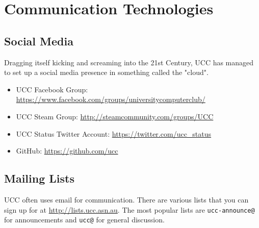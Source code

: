 \chapter{Communication Technologies}\label{Communications}


\newenvironment{ucclist}[1]
{
	\begin{mdframed}[nobreak=true]
	\subsection{#1}
	\begin{mdframed}
		Address:  <\href{mailto:#1@ucc.asn.au}{#1@ucc.asn.au}>
	\end{mdframed}
	\begin{mdframed}
		Subscribe:  \small{\url{http://lists.ucc.asn.au/mailman/listinfo/#1}}
	\end{mdframed}


	
}{\end{mdframed}}
\section{Social Media}

Dragging itself kicking and screaming into the 21st Century, UCC has managed to set up a social media presence in something called the "cloud".

\begin{itemize}
\item UCC Facebook Group:  \\ \noindent \url{https://www.facebook.com/groups/universitycomputerclub/}
\item UCC Steam Group: \url{http://steamcommunity.com/groups/UCC}
\item UCC Status Twitter Account: \url{https://twitter.com/ucc_status}
\item GitHub: \url{https://github.com/ucc}

\end{itemize}

\section{Mailing Lists}

UCC often uses email for communication. There are various lists that you can sign up for at \url{http://lists.ucc.asn.au}. The most popular lists are \texttt{ucc-announce@} for announcements and \texttt{ucc@} for general discussion.


